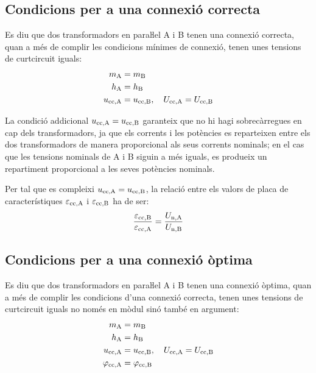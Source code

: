 \subsection{Condicions per a una connexió correcta}
 Es diu que dos transformadors en paraŀlel  A i B tenen una connexió correcta, quan a més de complir les condicions mínimes de connexió, tenen unes tensions de curtcircuit iguals:
\begin{align}
    m_\mathrm{A} &= m_\mathrm{B}\\
    h_\mathrm{A} &= h_\mathrm{B}\\
    u_\mathrm{cc,A} &= u_\mathrm{cc,B}, \quad U_\mathrm{cc,A} = U_\mathrm{cc,B}
\end{align}

La condició addicional  $u_\mathrm{cc,A} = u_\mathrm{cc,B}$ garanteix que no hi hagi sobrecàrregues en cap dels transformadors, ja que els corrents i les potències es reparteixen entre els dos transformadors de manera proporcional als seus corrents nominals; en el cas que les tensions nominals de A i B siguin a més iguals, es produeix un repartiment proporcional a les seves potències nominals.

Per tal que es compleixi $u_\mathrm{cc,A} = u_\mathrm{cc,B}$, la relació entre els valors de placa de característiques $\varepsilon_\mathrm{cc,A}$ i $\varepsilon_\mathrm{cc,B}$ ha de ser:
\begin{equation}
    \frac{\varepsilon_\mathrm{cc,B}}{\varepsilon_\mathrm{cc,A}} = \frac{U_\mathrm{n,A}}{U_\mathrm{n,B}}
\end{equation}

\subsection{Condicions per a una connexió òptima}

 Es diu que dos transformadors en paraŀlel A i B tenen una connexió òptima, quan a més de complir les condicions d'una connexió correcta, tenen unes tensions de curtcircuit iguals no només en mòdul sinó també en argument:
\begin{align}
    m_\mathrm{A} &= m_\mathrm{B}\\
    h_\mathrm{A} &= h_\mathrm{B}\\
    u_\mathrm{cc,A} &= u_\mathrm{cc,B}, \quad U_\mathrm{cc,A} = U_\mathrm{cc,B}\\
    \varphi_\mathrm{cc,A} &=\varphi_\mathrm{cc,B}
\end{align}

